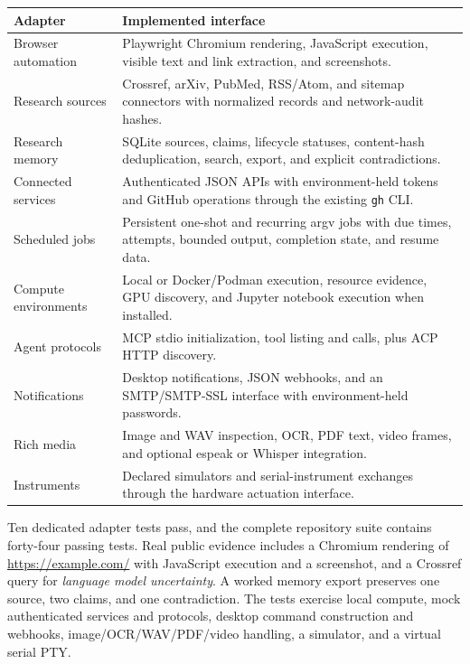\documentclass[11pt,a4paper]{article}
\begin{document}
\begin{center}
\small
\begin{tabular}{p{3.6cm}p{10.8cm}}
\toprule
Adapter & Implemented interface \\
\midrule
Browser automation & Playwright Chromium rendering, JavaScript execution, visible text and link extraction, and screenshots. \\
Research sources & Crossref, arXiv, PubMed, RSS/Atom, and sitemap connectors with normalized records and network-audit hashes. \\
Research memory & SQLite sources, claims, lifecycle statuses, content-hash deduplication, search, export, and explicit contradictions. \\
Connected services & Authenticated JSON APIs with environment-held tokens and GitHub operations through the existing \texttt{gh} CLI. \\
Scheduled jobs & Persistent one-shot and recurring argv jobs with due times, attempts, bounded output, completion state, and resume data. \\
Compute environments & Local or Docker/Podman execution, resource evidence, GPU discovery, and Jupyter notebook execution when installed. \\
Agent protocols & MCP stdio initialization, tool listing and calls, plus ACP HTTP discovery. \\
Notifications & Desktop notifications, JSON webhooks, and an SMTP/SMTP-SSL interface with environment-held passwords. \\
Rich media & Image and WAV inspection, OCR, PDF text, video frames, and optional espeak or Whisper integration. \\
Instruments & Declared simulators and serial-instrument exchanges through the hardware actuation interface. \\
\bottomrule
\end{tabular}
\end{center}

Ten dedicated adapter tests pass, and the complete repository suite contains forty-four passing tests. Real public evidence includes a Chromium rendering of \url{https://example.com/} with JavaScript execution and a screenshot, and a Crossref query for \emph{language model uncertainty}. A worked memory export preserves one source, two claims, and one contradiction. The tests exercise local compute, mock authenticated services and protocols, desktop command construction and webhooks, image/OCR/WAV/PDF/video handling, a simulator, and a virtual serial PTY.
\end{document}
